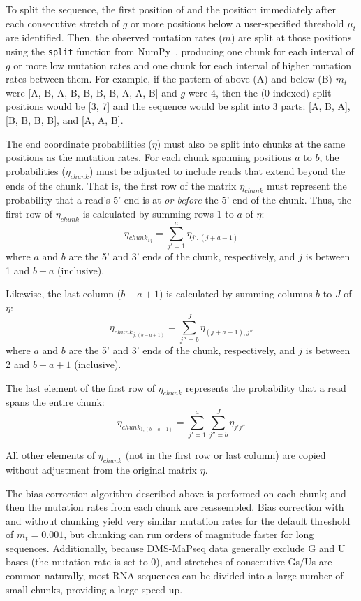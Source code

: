 \documentclass[11pt]{article}
\begin{document}
To split the sequence, the first position of and the position immediately after each consecutive stretch of $g$ or more positions below a user-specified threshold $\mu_t$ are identified.
Then, the observed mutation rates ($m$) are split at those positions using the \verb|split| function from NumPy~\cite{Harris2020}, producing one chunk for each interval of $g$ or more low mutation rates and one chunk for each interval of higher mutation rates between them.
For example, if the pattern of above (A) and below (B) $m_t$ were [A, B, A, B, B, B, B, A, A, B] and $g$ were 4, then the (0-indexed) split positions would be [3, 7] and the sequence would be split into 3 parts: [A, B, A], [B, B, B, B], and [A, A, B].

The end coordinate probabilities ($\eta$) must also be split into chunks at the same positions as the mutation rates.
For each chunk spanning positions $a$ to $b$, the probabilities ($\eta_{chunk}$) must be adjusted to include reads that extend beyond the ends of the chunk.
That is, the first row of the matrix $\eta_{chunk}$ must represent the probability that a read's 5' end is at \textit{or before} the 5' end of the chunk.
Thus, the first row of $\eta_{chunk}$ is calculated by summing rows 1 to $a$ of $\eta$:
$$\eta_{chunk_{1j}} = \sum_{j'=1}^a{\eta_{j',(j+a-1)}}$$
where $a$ and $b$ are the 5' and 3' ends of the chunk, respectively, and $j$ is between 1 and $b-a$ (inclusive).

Likewise, the last column ($b-a+1$) is calculated by summing columns $b$ to $J$ of $\eta$:
$$\eta_{chunk_{j,(b-a+1)}} = \sum_{j''=b}^J{\eta_{(j+a-1),j''}}$$
where $a$ and $b$ are the 5' and 3' ends of the chunk, respectively, and $j$ is between 2 and $b-a+1$ (inclusive).

The last element of the first row of $\eta_{chunk}$ represents the probability that a read spans the entire chunk:
$$\eta_{chunk_{1,(b-a+1)}} = \sum_{j'=1}^a{\sum_{j''=b}^J{\eta_{j'j''}}}$$

All other elements of $\eta_{chunk}$ (not in the first row or last column) are copied without adjustment from the original matrix $\eta$.

The bias correction algorithm described above is performed on each chunk; and then the mutation rates from each chunk are reassembled.
Bias correction with and without chunking yield very similar mutation rates for the default threshold of $m_t = 0.001$, but chunking can run orders of magnitude faster for long sequences.
Additionally, because DMS-MaPseq data generally exclude G and U bases (the mutation rate is set to 0), and stretches of consecutive Gs/Us are common naturally, most RNA sequences can be divided into a large number of small chunks, providing a large speed-up.
\end{document}
